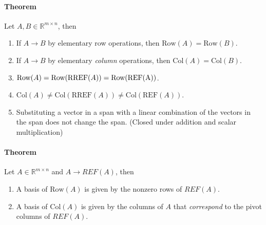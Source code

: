 \paragraph*{Theorem}
Let $A, B \in \mathbb{R}^{m \times n}$, then
\begin{enumerate}
    \item If $A \rightarrow B$ by elementary row operations, then $\text{Row}(A) = \text{Row}(B)$.
    \item If $A \rightarrow B$ by elementary \emph{column} operations, then $\text{Col}(A) = \text{Col}(B)$.
    \item $\text{Row}(A) = \text{Row}(\text{RREF}(A)) = \text{Row(\text{REF}(A))}$.
    \item $\text{Col}(A) \neq \text{Col}(\text{RREF}(A)) \neq \text{Col}(\text{REF}(A))$.
    \item Substituting a vector in a span with a linear combination of the vectors in the span does not change the span. (Closed under addition and scalar multiplication)
\end{enumerate}

\paragraph*{Theorem}
Let $A \in \mathbb{R}^{m \times n}$ and $A \rightarrow REF(A)$, then
\begin{enumerate}
    \item A basis of $\text{Row}(A)$ is given by the nonzero rows of $REF(A)$.
    \item A basis of $\text{Col}(A)$ is given by the columns of $A$ that \emph{correspond} to the pivot columns of $REF(A)$.
\end{enumerate}

